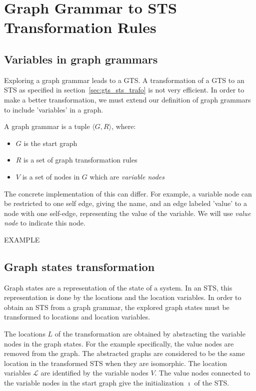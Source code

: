 \section{Graph Grammar to STS Transformation Rules}\label{sec:gg-to-sts}

\subsection{Variables in graph grammars}
Exploring a graph grammar leads to a GTS. A transformation of a GTS to an STS as specified in section~\ref{sec:gts_sts_trafo} is not very efficient. In order to make a better transformation, we must extend our definition of graph grammars to include 'variables' in a graph.
\\
\begin{definition}
A graph grammar is a tuple $\langle G, R\rangle$, where:
\begin{itemize}
  \item $G$ is the start graph
  \item $R$ is a set of graph transformation rules
  \item $V$ is a set of nodes in $G$ which are \textit{variable nodes}
\end{itemize}
\end{definition}

The concrete implementation of this can differ. For example, a variable node can be restricted to one self edge, giving the name, and an edge labeled 'value' to a node with one self-edge, representing the value of the variable. We will use \textit{value node} to indicate this node. 

EXAMPLE

\subsection{Graph states transformation}
Graph states are a representation of the state of a system. In an STS, this representation is done by the locations and the location variables. In order to obtain an STS from a graph grammar, the explored graph states must be transformed to locations and location variables. 

The locations $L$ of the transformation are obtained by abstracting the variable nodes in the graph states. For the example specifically, the value nodes are removed from the graph. The abstracted graphs are considered to be the same location in the transformed STS when they are isomorphic. The location variables $\mathcal{L}$ are identified by the variable nodes $V$. The value nodes connected to the variable nodes in the start graph give the initialization $\imath$ of the STS.

